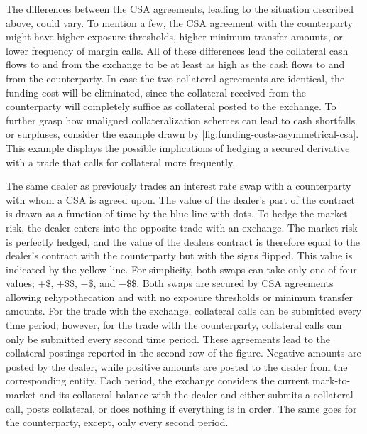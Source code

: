\documentclass[main.tex]{subfiles}
\begin{document}
        The differences between the CSA agreements, leading to the situation described above, could vary. 
        To mention a few, the CSA agreement with the counterparty might have higher exposure thresholds, 
        higher minimum transfer amounts, or lower frequency of margin calls.
        All of these differences lead the collateral cash flows to and from the exchange 
        to be at least as high as the cash flows to and from the counterparty. 
        In case the two collateral agreements are identical, the funding cost will be eliminated, 
        since the collateral received from the counterparty will completely suffice as collateral posted to the exchange.        
        To further grasp how unaligned collateralization schemes can lead to cash shortfalls or surpluses, 
        consider the example drawn by \cref{fig:funding-costs-asymmetrical-csa}.
        This example displays the possible implications of hedging a secured derivative
        with a trade that calls for collateral more frequently.

        The same dealer as previously trades an interest rate swap with a counterparty with whom a CSA is agreed upon. 
        The value of the dealer's part of the contract is drawn as a function of time by the blue line with dots.
        To hedge the market risk, the dealer enters into the opposite trade with an exchange.
        The market risk is perfectly hedged, and the value of the dealers contract is therefore
        equal to the dealer's contract with the counterparty but with the signs flipped.
        This value is indicated by the yellow line.
        For simplicity, both swaps can take only one of four values; $+\$$, $+\$\$$, $-\$$, and $-\$\$$.
        Both swaps are secured by CSA agreements allowing rehypothecation 
        and with no exposure thresholds or minimum transfer amounts.
        For the trade with the exchange, collateral calls can be submitted every time period;
        however, for the trade with the counterparty, collateral calls can only be submitted every second time period.
        These agreements lead to the collateral postings reported in the second row of the figure.
        Negative amounts are posted by the dealer, while positive amounts are posted to the dealer 
        from the corresponding entity.
        Each period, the exchange considers the current mark-to-market and its collateral balance with the dealer
        and either submits a collateral call, posts collateral, or does nothing if everything is in order.
        The same goes for the counterparty, except, only every second period.
\end{document}
